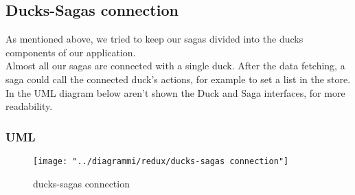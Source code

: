 \documentclass[../redux]{subfiles}
\begin{document}
	\subsection{Ducks-Sagas connection}
	As mentioned above, we tried to keep our sagas divided into the ducks components of our application.\\
	Almost all our sagas are connected with a single duck. After the data fetching, a saga could call the connected duck's actions, for example to set a list in the store.
	In the UML diagram below aren't shown the Duck and Saga interfaces, for more readability.
	\subsubsection{UML}
	\begin{figure}[H]
		\centering
		\texttt{[image: "../diagrammi/redux/ducks-sagas connection"]}
		\caption{ducks-sagas connection}
		\label{fig:Ducks-sagas connection}
	\end{figure}
\end{document}
